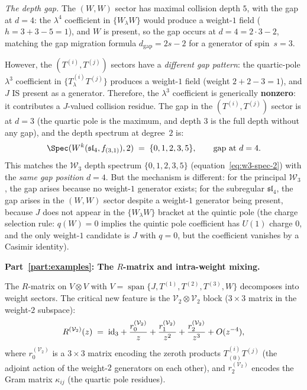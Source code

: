 \begin{computation}
\emph{The depth gap.}
The $(W,W)$ sector has maximal collision depth $5$, with
the gap at $d = 4$: the $\lambda^4$ coefficient in
$\{W_\lambda W\}$ would produce a weight-$1$ field
($h = 3 + 3 - 5 = 1$), and $W$ is present, so the gap
occurs at $d = 4 = 2 \cdot 3 - 2$, matching the gap
migration formula $d_{\mathrm{gap}} = 2s - 2$ for a
generator of spin~$s = 3$.

However, the $(T^{(i)}, T^{(j)})$ sectors have a
\emph{different gap pattern}: the quartic-pole $\lambda^3$
coefficient in $\{T^{(i)}_\lambda T^{(j)}\}$ produces
a weight-$1$ field (weight $2+2-3=1$), and $J$ IS present
as a generator. Therefore, the $\lambda^3$ coefficient
is generically \textbf{nonzero}: it contributes a
$J$-valued collision residue. The gap in the
$(T^{(i)},T^{(j)})$ sector is at $d = 3$
(the quartic pole is the maximum, and depth $3$ is the
full depth without any gap), and the depth spectrum at
degree~$2$ is:
\[
\Spec(W^k(\mathfrak{sl}_4, f_{(3,1)}), 2)
\;=\;
\{0, 1, 2, 3, 5\},
\qquad
\text{gap at } d = 4.
\]
This matches the $\mathcal W_3$ depth spectrum
$\{0,1,2,3,5\}$ (equation~\eqref{eq:w3-spec-2})
with the \emph{same gap position} $d = 4$. But the
mechanism is different: for the principal $\mathcal W_3$,
the gap arises because no weight-$1$ generator exists;
for the subregular $\mathfrak{sl}_4$, the gap arises
in the $(W,W)$ sector despite a weight-$1$ generator
being present, because $J$ does not appear in the
$\{W_\lambda W\}$ bracket at the quintic pole
(the charge selection rule: $q(W) = 0$ implies the
quintic pole coefficient has $U(1)$ charge $0$, and
the only weight-$1$ candidate is $J$ with $q = 0$,
but the coefficient vanishes by a Casimir identity).

\medskip
\noindent\textbf{Part~\ref{part:examples}: The $R$-matrix and
intra-weight mixing.}

The $R$-matrix on
$V \otimes V$ with
$V = \operatorname{span}\{J, T^{(1)}, T^{(2)}, T^{(3)}, W\}$
decomposes into weight sectors. The critical new feature
is the $\mathcal V_2 \otimes \mathcal V_2$ block
($3 \times 3$ matrix in the weight-$2$ subspace):
\begin{equation}\label{eq:r-matrix-sl4-subreg-weight2}
R^{(\mathcal V_2)}(z)
\;=\;
\mathrm{id}_3 + \frac{r_0^{(\mathcal V_2)}}{z}
+ \frac{r_1^{(\mathcal V_2)}}{z^2}
+ \frac{r_2^{(\mathcal V_2)}}{z^3}
+ O(z^{-4}),
\end{equation}
where $r_0^{(\mathcal V_2)}$ is a $3 \times 3$
matrix encoding the zeroth products
$T^{(i)}_{(0)} T^{(j)}$ (the adjoint action of the
weight-$2$ generators on each other), and
$r_2^{(\mathcal V_2)}$ encodes the Gram matrix
$\kappa_{ij}$ (the quartic pole residues).


\end{computation}
